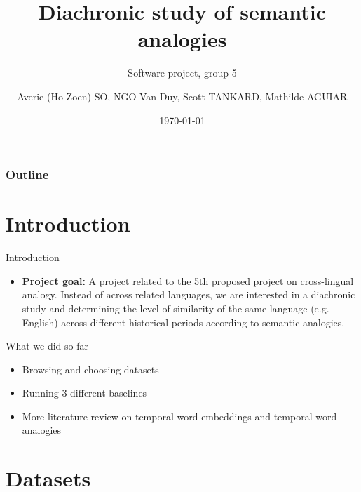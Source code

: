 \documentclass[10pt]{beamer}
\title[]{
Diachronic study of semantic analogies 
}%
\subtitle{ 
Software project, group 5
}%
\author[UL]{Averie (Ho Zoen) SO, NGO Van Duy, Scott TANKARD, Mathilde AGUIAR
}%
\date[\textcolor{white}{Our title}]
{
\today{}}
\institute[]{Universit\'e de Lorraine}
\begin{document}
\frame{\titlepage}
\begin{frame}
\frametitle{Outline}
\tableofcontents
\end{frame}



\section{Introduction}
\begin{frame}{Introduction}
\begin{itemize}
\item
\textbf{Project goal:} 
A project related to the 5th proposed project on cross-lingual analogy. 
Instead of across related languages, we are interested in a diachronic study and determining the level of similarity of the same language (e.g. English) across different historical periods according to semantic analogies.
\end{itemize}
\end{frame}

\begin{frame}{What we did so far}
\begin{itemize}
    \item Browsing and choosing datasets 
    \item Running 3 different baselines 
    \item More literature review on temporal word embeddings and temporal word analogies
\end{itemize}
\end{frame}


\section{Datasets}
\end{document}
